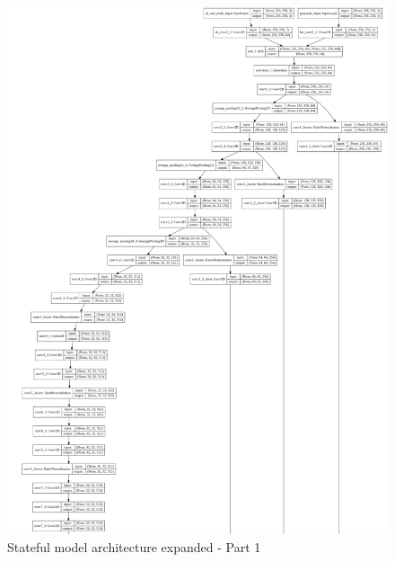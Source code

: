 \documentclass[12pt,openright,oneside,a4paper,english]{abntex2}
\begin{document}
\begin{otherlanguage}{english}
\begin{figure}[!htb]
\centering
\includegraphics[height=\textheight]{model_plot/Stateful1}
\caption{Stateful model architecture expanded - Part 1}
\label{stateful_plot_1}
\end{figure}


\end{otherlanguage}
\end{document}
